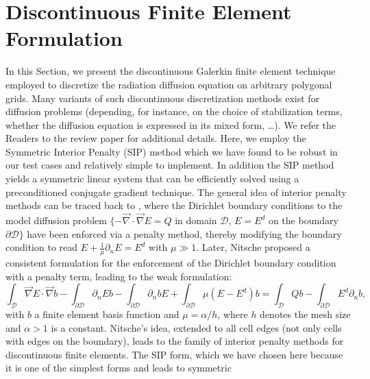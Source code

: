 \documentclass[preprint,10pt]{elsarticle}
\renewcommand{\div}{\vec{\nabla}\! \cdot \!}
\newcommand{\grad}{\vec{\nabla}}
\newcommand{\D}{\mathcal{D}}
\newcommand{\tf}{b}
\begin{document}
\section{Discontinuous Finite Element Formulation} \label{sec:ip}

In this Section, we present the discontinuous Galerkin finite element technique employed to
discretize the radiation diffusion equation on arbitrary polygonal grids. Many variants of such discontinuous discretization
methods exist for diffusion problems (depending, for instance, on the choice of stabilization terms, whether 
the diffusion equation is expressed in its mixed form, \ldots). We refer the Readers to the review
paper \cite{DouglasN.Arnold2002} for additional details. Here, we employ the Symmetric
Interior Penalty (SIP) method which we have found to be robust in our test cases and relatively simple 
to implement. In addition the SIP method yields a symmetric linear system that can be efficiently solved using
a preconditioned conjugate gradient technique.
The general idea of interior penalty methods can be traced back to \cite{lions1968}, where the Dirichlet
boundary conditions to the model diffusion problem $\{-\div \grad E = Q$ in domain $\D$, $E=E^d$ on 
the boundary $\partial \D\}$ have been enforced via a penalty method, thereby modifying the 
boundary condition to read $E+\frac{1}{\mu}\partial_n E = E^d$ with $\mu\gg 1$. Later, 
Nitsche \cite{nitsche1971} proposed a consistent formulation for the enforcement of the 
Dirichlet boundary condition with a penalty term, leading to the weak formulation:
\begin{equation}
\label{eq:penalty_nitsche_bd_only}
\int_{\D} \grad E \cdot \grad \tf
- \int_{\partial\D} \partial_n E \tf  
- \int_{\partial\D} \partial_n \tf E 
+ \int_{\partial\D} \mu(E-E^d) \tf 
=
\int_{\D} Q \tf 
- \int_{\partial\D} E^d \partial_n \tf ,
\end{equation}
with $\tf$ a finite element basis function and $\mu=\alpha/h$, where $h$ denotes 
the mesh size and $\alpha>1$ is a constant.
%
Nitsche's idea, extended to all cell edges (not only cells with edges on the boundary), leads
to the family of interior penalty methods for discontinuous finite elements. The SIP form,
which we have chosen here because it is one of the simplest forms and leads to symmetric 
\end{document}
